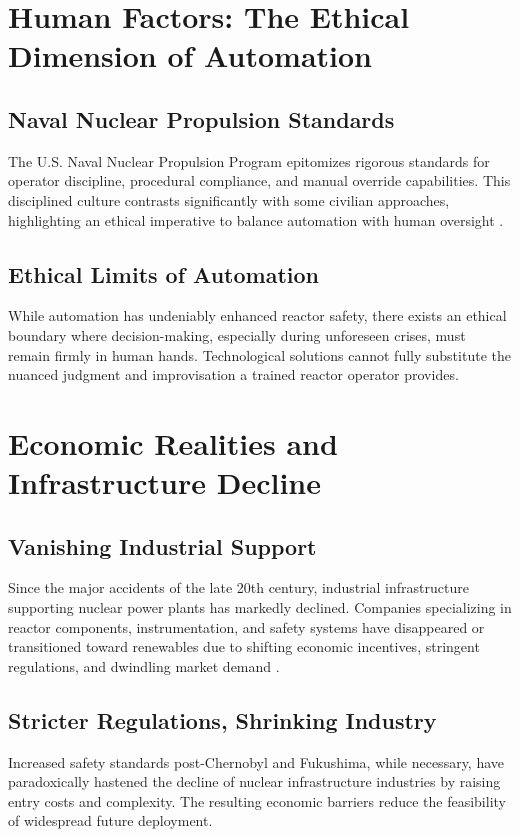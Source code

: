 \documentclass[12pt]{article}
\begin{document}
\section{Human Factors: The Ethical Dimension of Automation}

\subsection{Naval Nuclear Propulsion Standards}
The U.S. Naval Nuclear Propulsion Program epitomizes rigorous standards for operator discipline, procedural compliance, and manual override capabilities. This disciplined culture contrasts significantly with some civilian approaches, highlighting an ethical imperative to balance automation with human oversight \cite{meshkati1991human}.

\subsection{Ethical Limits of Automation}
While automation has undeniably enhanced reactor safety, there exists an ethical boundary where decision-making, especially during unforeseen crises, must remain firmly in human hands. Technological solutions cannot fully substitute the nuanced judgment and improvisation a trained reactor operator provides.

\section{Economic Realities and Infrastructure Decline}

\subsection{Vanishing Industrial Support}
Since the major accidents of the late 20th century, industrial infrastructure supporting nuclear power plants has markedly declined. Companies specializing in reactor components, instrumentation, and safety systems have disappeared or transitioned toward renewables due to shifting economic incentives, stringent regulations, and dwindling market demand \cite{shirvan2024cost}.

\subsection{Stricter Regulations, Shrinking Industry}
Increased safety standards post-Chernobyl and Fukushima, while necessary, have paradoxically hastened the decline of nuclear infrastructure industries by raising entry costs and complexity. The resulting economic barriers reduce the feasibility of widespread future deployment.
\end{document}
